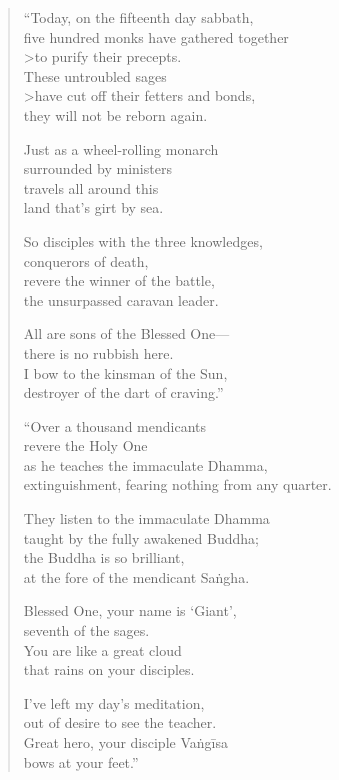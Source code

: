 \documentclass[12pt,openany]{book}%
\begin{document}
\begin{verse}
“Today, on the fifteenth day sabbath, \\
five hundred monks have gathered together \\>to purify their precepts. \\
These untroubled sages \\>have cut off their fetters and bonds, \\
they will not be reborn again. 

Just as a wheel-rolling monarch \\
surrounded by ministers \\
travels all around this \\
land that’s girt by sea. 

So disciples with the three knowledges, \\
conquerors of death, \\
revere the winner of the battle, \\
the unsurpassed caravan leader. 

All are sons of the Blessed One—\\
there is no rubbish here. \\
I bow to the kinsman of the Sun, \\
destroyer of the dart of craving.” 

“Over a thousand mendicants \\
revere the Holy One \\
as he teaches the immaculate Dhamma, \\
extinguishment, fearing nothing from any quarter. 

They listen to the immaculate Dhamma \\
taught by the fully awakened Buddha; \\
the Buddha is so brilliant, \\
at the fore of the mendicant \textsanskrit{Saṅgha}. 

Blessed One, your name is ‘Giant’, \\
seventh of the sages. \\
You are like a great cloud \\
that rains on your disciples. 

I’ve left my day’s meditation, \\
out of desire to see the teacher. \\
Great hero, your disciple \textsanskrit{Vaṅgīsa} \\
bows at your feet.” 


\end{verse}
\end{document}
